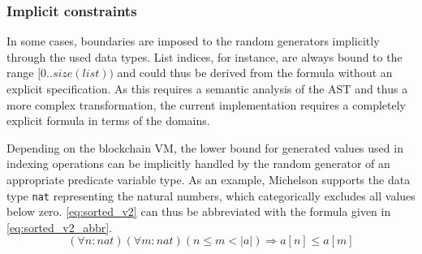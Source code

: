 \subsubsection{Implicit constraints}
In some cases, boundaries are imposed to the random generators implicitly through the used data types. List indices, for instance, are always bound to the range $[0.. size(list))$ and could thus be derived from the formula without an explicit specification. As this requires a semantic analysis of the AST and thus a more complex transformation, the current implementation requires a completely explicit formula in terms of the domains. 

Depending on the blockchain VM, the lower bound for generated values used in indexing operations can be implicitly handled by the random generator of an appropriate predicate variable type. As an example, Michelson supports the data type \texttt{nat} representing the natural numbers, which categorically excludes all values below zero. \eqref{eq:sorted_v2} can thus be abbreviated with the formula given in \eqref{eq:sorted_v2_abbr}.
\begin{equation}\label{eq:sorted_v2_abbr}
	(\forall n : nat)(\forall m : nat) (n \le m < |a|) \Rightarrow a[n] \leq a[m]
\end{equation}